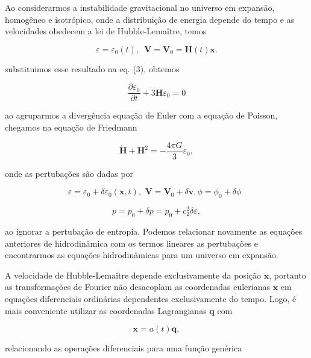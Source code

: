 Ao considerarmos a instabilidade gravitacional no universo em expansão, homogêneo e isotrópico, onde a distribuição de energia depende do tempo e as velocidades obedecem a lei de Hubble-Lemaître, temos

\begin{equation}\label{eq20}
	\varepsilon = \varepsilon_0 (t), \,\,\, \mathbf{V} = \mathbf{V}_0 = \mathbf{H} (t) \mathbf{x}.
\end{equation}
 
 substituimos esse resultado na eq. (3), obtemos
 
\begin{equation}\label{eq21}
	\dfrac{\partial \varepsilon_0}{\partial t}  + 3 \mathbf{H}\varepsilon_0 = 0 
\end{equation} 

ao agruparmos a divergência equação de Euler com a equação de Poisson, chegamos na equação de Friedmann

\begin{equation}\label{eq22}
	\dot{\mathbf{H}} + \mathbf{H}^2 = - \dfrac{4\pi G}{3}\varepsilon_0,
\end{equation}

onde as pertubações são dadas por

\begin{equation}\label{eq23}
	\varepsilon = \varepsilon_0 + \delta\varepsilon_0 (\mathbf{x},t),\,\, \mathbf{V} = \mathbf{V}_0 + \delta\mathbf{v} , \phi= \phi_0 + \delta\phi\,\,\, 
\end{equation}

$$p = p_0 + \delta p= p_0 + c_2^2\delta\varepsilon ,$$

ao ignorar a pertubação de entropia. Podemos relacionar novamente as equações anteriores de hidrodinâmica com os termos lineares as pertubações e encontrarmos as equações hidrodinâmicas para um universo em expansão.

A velocidade de Hubble-Lemaître depende exclusivamente da posição $ \mathbf{x} $, portanto as transformações de Fourier não desacoplam as coordenadas eulerianas $ \mathbf{x} $ em equações diferenciais ordinárias dependentes exclusivamente do tempo. Logo, é mais conveniente utilizar as coordenadas Lagrangianas $ \mathbf{q} $ com  

\begin{equation}\label{eq24}
	\mathbf{x} = a(t)\mathbf{q},
\end{equation}

relacionando as operações diferenciais para uma função genérica 

